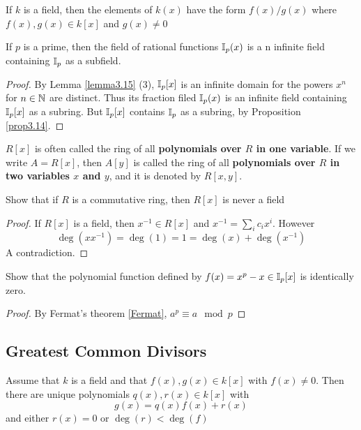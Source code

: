 \documentclass[11pt]{article}
\begin{document}
\begin{proposition}[]
If \(k\) is a field, then the elements of \(k(x)\) have the form \(f(x)/g(x)\)
where \(f(x),g(x)\in k[x]\) and \(g(x)\neq 0\)
\end{proposition}

\begin{proposition}[]
If \(p\) is a prime, then the field of rational functions \(\mathbb{I}_p(x)\) is a n
infinite field containing \(\mathbb{I}_p\) as a subfield.
\end{proposition}

\begin{proof}
By Lemma \ref{lemma3.15} (3), \(\mathbb{I}_p[x]\) is an infinite domain for the powers
\(x^n\) for \(n\in\mathbb{N}\) are distinct. Thus its fraction filed \(\mathbb{I}_p(x)\) is an
infinite field containing \(\mathbb{I}_p[x]\) as a subring. But \(\mathbb{I}_p[x]\) contains
\(\mathbb{I}_p\) as a subring, by Proposition \ref{prop3.14}.
\end{proof}


\(R[x]\) is often called the ring of all \textbf{polynomials over \(R\) in one variable}.
If we write \(A=R[x]\), then \(A[y]\) is called the ring of all 
\textbf{polynomials over \(R\) in two variables \(x\) and \(y\)}, and it is denoted by \(R[x,y]\).

\begin{exercise}
Show that if \(R\) is a commutative ring, then \(R[x]\) is never a field
\end{exercise}

\begin{proof}
If \(R[x]\) is a field, then \(x^{-1}\in R[x]\) and \(x^{-1}=\sum_ic_ix^i\).
However
\begin{equation*}
\deg(xx^{-1})=\deg(1)=1=\deg(x)+\deg(x^{-1})
\end{equation*}
A contradiction.
\end{proof}

\begin{exercise}
\label{ex3.22}
Show that the polynomial function defined by \(f(x)=x^p-x\in\mathbb{I}_p[x]\) is
identically zero.
\end{exercise}

\begin{proof}
By Fermat's theorem \ref{Fermat}, \(a^p\equiv a\mod p\)
\end{proof}
\subsection{Greatest Common Divisors}
\label{sec:orgab5911a}
\begin{theorem}
Assume that \(k\) is a field and that \(f(x),g(x)\in k[x]\) with \(f(x)\neq 0\).
Then there are unique polynomials \(q(x),r(x)\in k[x]\) with
\begin{equation*}
g(x)=q(x)f(x)+r(x)
\end{equation*}
and either \(r(x)=0\) or \(\deg(r)<\deg(f)\)
\end{theorem}
\end{document}
